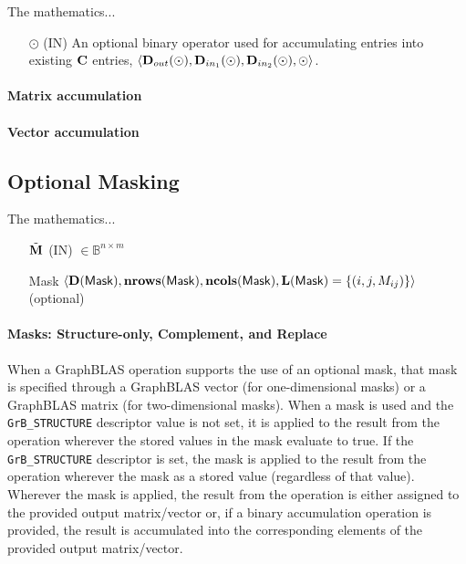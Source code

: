 The mathematics...

\begin{itemize}
    \item[$\odot$] ({\sf IN}) An optional binary operator used for accumulating
    entries into existing ${\bf C}$ entries, $\langle \mbox{$\mathbf{D}_{out}$}(\odot),\mbox{$\mathbf{D}_{in_{1}}$}(\odot),\mbox{$\mathbf{D}_{in_{2}}$}(\odot), \odot \rangle$.
\end{itemize}

\paragraph{Matrix accumulation}




\paragraph{Vector accumulation}




\subsection{Optional Masking}

The mathematics...

\begin{itemize}
    \item[$\tilde{{\bf M}}$] ({\sf IN}) $\in \mathbb{B}^{n\times m}$

	\item[{\sf Mask}] $\langle \bold{D}({\sf Mask}),\bold{nrows}({\sf Mask}),\bold{ncols}({\sf Mask}),\bold{L}({\sf Mask}) = \{(i,j,M_{ij}) \} \rangle$ (optional)
\end{itemize}

\paragraph{Masks: Structure-only, Complement, and Replace}

When a GraphBLAS operation supports the use of an optional mask, that mask is
specified through a GraphBLAS vector (for one-dimensional masks) or
a GraphBLAS matrix (for two-dimensional masks).  When a mask is used and the 
{\tt GrB\_STRUCTURE} descriptor value is not set, it is applied to the result 
from the operation wherever the stored values in the mask evaluate to true.  If
the {\tt GrB\_STRUCTURE} descriptor is set, the mask is applied to the result
from the operation wherever the mask as a stored value (regardless of that value).
Wherever the mask is applied, the result from the operation is either assigned 
to the provided output matrix/vector or, if a binary accumulation operation is 
provided, the result is accumulated into the corresponding elements of the provided 
output matrix/vector.

